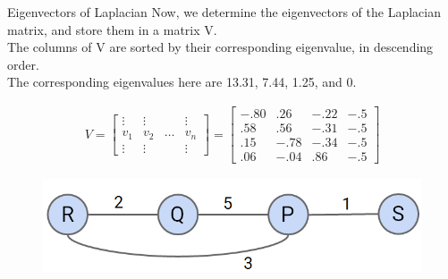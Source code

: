 \documentclass[aspectratio=169]{../latex_main/tntbeamer}  %
\begin{document}
	\begin{frame}{Eigenvectors of Laplacian}
	    Now, we determine the eigenvectors of the Laplacian matrix, and store them in a matrix V.\\
        The columns of V are sorted by their corresponding eigenvalue, in descending order.\\
        The corresponding eigenvalues here are 13.31, 7.44, 1.25, and 0.


	    \begin{align*}
	        V = \left[\begin{array}{cccc}
	            \vdots & \vdots &  & \vdots \\
	            v_1 & v_2 & \dots & v_n \\
	            \vdots & \vdots &  & \vdots
	        \end{array}\right] 
	        = \left[\begin{array}{cccc}
	            -.80 & .26 & -.22 & -.5 \\
	            .58 & .56 & -.31 & -.5 \\
	            .15 & -.78 & -.34 & -.5 \\
	            .06 & -.04 & .86 & -.5
	        \end{array}\right] 
	    \end{align*}
	    \begin{figure}
	        \centering
	        \includegraphics[scale=.5]{Bild15}
	    \end{figure}
	\end{frame}
\end{document}
